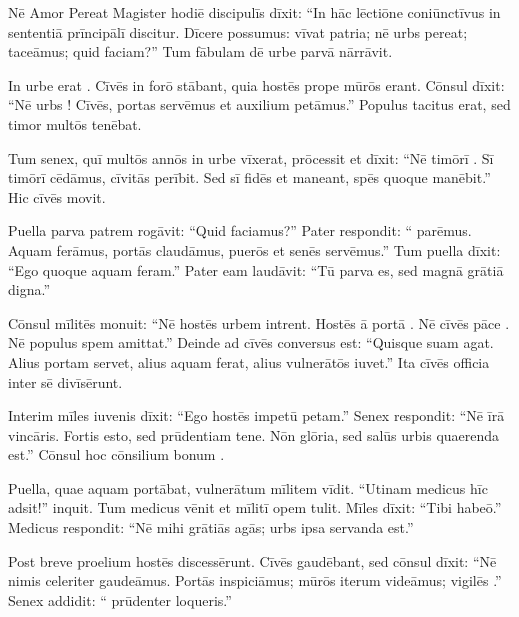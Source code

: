 \documentclass[12pt]{nextbook}
\begin{document}
\begin{readersection}{Nē Amor Pereat}
Magister hodiē discipulīs dīxit: “In hāc lēctiōne coniūnctīvus in sententiā prīncipālī discitur. Dīcere possumus: vīvat patria; nē urbs pereat; taceāmus; quid faciam?” Tum fābulam dē urbe parvā nārrāvit.

In urbe erat . Cīvēs in forō stābant, quia hostēs prope mūrōs erant. Cōnsul dīxit: “Nē urbs ! Cīvēs, portas servēmus et auxilium petāmus.” Populus tacitus erat, sed timor multōs tenēbat.

Tum senex, quī multōs annōs in urbe vīxerat, prōcessit et dīxit: “Nē timōrī . Sī timōrī cēdāmus, cīvitās perībit. Sed sī fidēs et  maneant, spēs quoque manēbit.” Hic  cīvēs movit.

Puella parva patrem rogāvit: “Quid faciamus?” Pater respondit: “ parēmus. Aquam ferāmus, portās claudāmus, puerōs et senēs servēmus.” Tum puella dīxit: “Ego quoque aquam feram.” Pater eam laudāvit: “Tū parva es, sed magnā grātiā digna.”

Cōnsul mīlitēs monuit: “Nē hostēs urbem intrent. Hostēs ā portā . Nē cīvēs pāce . Nē populus spem amittat.” Deinde ad cīvēs conversus est: “Quisque suam  agat. Alius portam servet, alius aquam ferat, alius vulnerātōs iuvet.” Ita cīvēs officia inter sē divīsērunt.

Interim mīles iuvenis dīxit: “Ego hostēs impetū petam.” Senex respondit: “Nē īrā vincāris. Fortis esto, sed prūdentiam tene. Nōn glōria, sed salūs urbis quaerenda est.” Cōnsul hoc cōnsilium bonum .

Puella, quae aquam portābat, vulnerātum mīlitem vīdit. “Utinam medicus hīc adsit!” inquit. Tum medicus vēnit et mīlitī opem tulit. Mīles dīxit: “Tibi  habeō.” Medicus respondit: “Nē mihi grātiās agās; urbs ipsa servanda est.”

Post breve proelium hostēs discessērunt. Cīvēs gaudēbant, sed cōnsul dīxit: “Nē nimis celeriter gaudeāmus. Portās  inspiciāmus; mūrōs iterum videāmus; vigilēs .” Senex addidit: “ prūdenter loqueris.”


\end{readersection}
\end{document}
